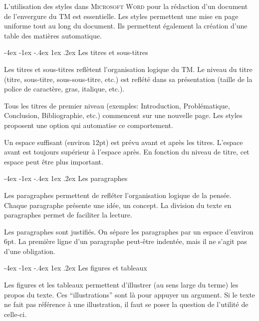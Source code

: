 \documentclass[
  a4paper,
]{book}
\makeatletter
\renewcommand{\section}{\@startsection{section}{1}{\z@}
{-4ex \@plus -1ex \@minus -.4ex}
{1ex \@plus.2ex }
{\normalfont\large\sffamily\bfseries}}
\newlength\esp
\makeatother
\begin{document}
L'utilisation des styles dans \textsc{Microsoft Word} pour la rédaction
d'un document de l'envergure du TM est essentielle. Les styles
permettent une mise en page uniforme tout au long du document. Ils
permettent également la création d'une table des matières automatique.

\hypertarget{les-titres-et-sous-titres}{%
\section{Les titres et sous-titres}\label{les-titres-et-sous-titres}}

Les titres et sous-titres reflètent l'organisation logique du TM. Le
niveau du titre (titre, sous-titre, sous-sous-titre, etc.) est reflété
dans sa présentation (taille de la police de caractère, gras, italique,
etc.).

Tous les titres de premier niveau (exemples: Introduction,
Problématique, Conclusion, Bibliographie, etc.) commencent sur une
nouvelle page. Les styles proposent une option qui automatise ce
comportement.

Un espace suffisant (environ 12pt) est prévu avant et après les titres.
L'espace avant est toujours supérieur à l'espace après. En fonction du
niveau de titre, cet espace peut être plus important.

\hypertarget{les-paragraphes}{%
\section{Les paragraphes}\label{les-paragraphes}}

Les paragraphes permettent de refléter l'organisation logique de la
pensée. Chaque paragraphe présente une idée, un concept. La division du
texte en paragraphes permet de faciliter la lecture.

Les paragraphes sont justifiés. On sépare les paragraphes par un espace
d'environ 6pt. La première ligne d'un paragraphe peut-être indentée,
mais il ne s'agit pas d'une obligation.

\hypertarget{les-figures-et-tableaux}{%
\section{Les figures et tableaux}\label{les-figures-et-tableaux}}

Les figures et les tableaux permettent d'illustrer (au sens large du
terme) les propos du texte. Ces ``illustrations'' sont là pour appuyer
un argument. Si le texte ne fait pas référence à une illustration, il
faut se poser la question de l'utilité de celle-ci.
\end{document}
